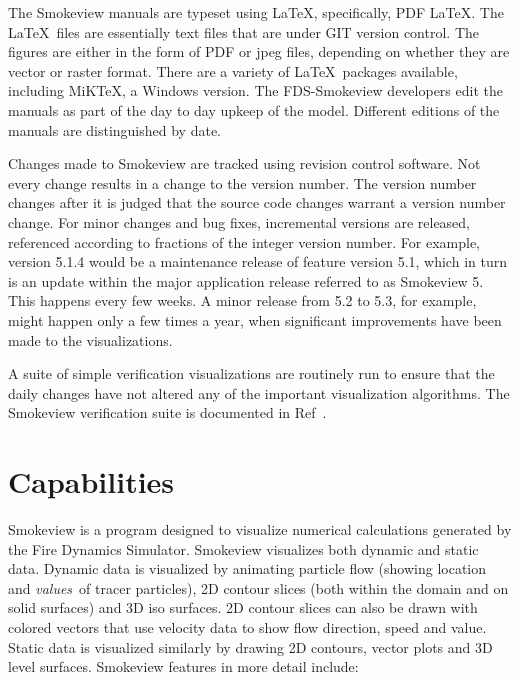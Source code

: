 \documentclass[11pt,twoside]{book}
\begin{document}
The Smokeview manuals are typeset using \LaTeX, specifically, PDF
\LaTeX. The \LaTeX\ files are essentially text files that are
under GIT version control. The figures are either in the form
of PDF or jpeg files, depending on whether they are vector or
raster format. There are a variety of \LaTeX\ packages available,
including MiKTeX, a Windows version. The FDS-Smokeview developers
edit the manuals as part of the day to day upkeep of the model.
Different editions of the manuals are distinguished by date.

Changes made to Smokeview are tracked using revision control
software. Not every change results in a change to the version
number. The version number changes after it is judged that the
source code changes warrant a version number change. For minor
changes and bug fixes, incremental versions are released,
referenced according to fractions of the integer version number.
For example, version 5.1.4 would be a maintenance release of
feature version 5.1, which in turn is an update within the major
application release referred to as Smokeview 5. This happens every
few weeks. A minor release from 5.2 to 5.3, for example, might
happen only a few times a year, when significant improvements have
been made to the visualizations.

A suite of simple verification visualizations are routinely run to
ensure that the daily changes have not altered any of the
important visualization algorithms. The Smokeview verification
suite is documented in Ref~\cite{Smokeview_Verification_Guide}.

%
%

\section{Capabilities}

Smokeview is a program designed to visualize numerical
calculations generated by the Fire Dynamics Simulator. Smokeview
visualizes both dynamic and static data.  Dynamic data is
visualized by animating particle flow (showing location and {\em
values}\ of tracer particles), 2D contour slices (both within the
domain and on solid surfaces) and 3D iso surfaces.  2D contour
slices can also be drawn with colored vectors that use velocity
data to show flow direction, speed and value. Static data is
visualized similarly by drawing 2D contours, vector plots and 3D
level surfaces. Smokeview features in more detail include:
\end{document}
